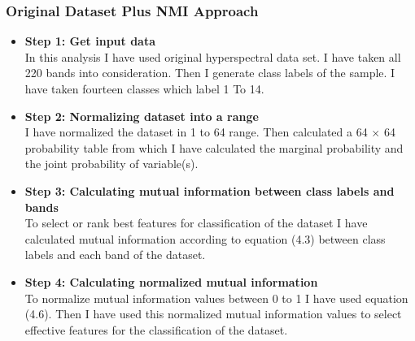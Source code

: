 \documentclass[document.tex]{subfiles}
\begin{document}
\subsubsection{Original Dataset Plus NMI Approach}
\begin{itemize}
	\item \textbf{Step 1: Get input data}\\
	In this analysis I have used original hyperspectral data set. I have taken all 220 bands into consideration. Then I generate class labels of the sample. I have taken
	fourteen classes which label 1 To 14.
	\item \textbf{Step 2: Normalizing dataset into a range}\\
	I have normalized the dataset in 1 to 64 range. Then calculated a 64 $\times$ 64 probability table from which I have calculated the marginal probability and the joint probability of variable(s). 
	\item \textbf{Step 3: Calculating mutual information between class labels and bands}\\
	To select or rank best features for classification of the dataset I have calculated mutual information according to equation (4.3) between class labels and each band of the dataset.
	\item \textbf{Step 4: Calculating normalized mutual information}\\
	To normalize mutual information values between 0 to 1 I have used equation (4.6). Then I have used this normalized mutual information values to select effective features for the classification of the dataset. 
\end{itemize}
\end{document}
